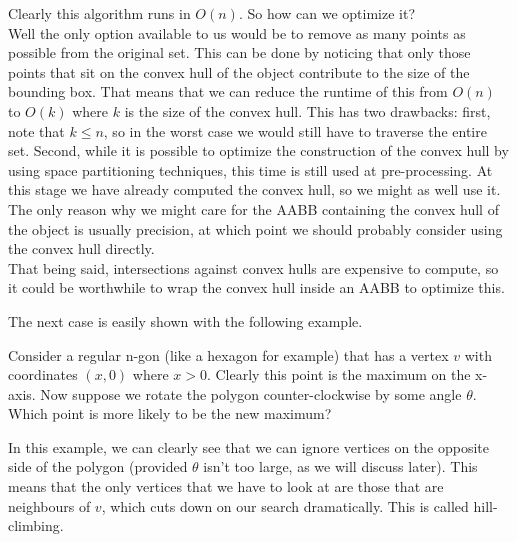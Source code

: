     Clearly this algorithm runs in $O(n)$. So how can we optimize it?\\
    Well the only option available to us would be to remove as many points as
    possible from the original set. This can be done by noticing that only those
    points that sit on the convex hull of the object contribute to the size of
    the bounding box. That means that we can reduce the runtime of this from
    $O(n)$ to $O(k)$ where $k$ is the size of the convex hull. This has two
    drawbacks: first, note that $k \leq n$, so in the worst case we would still
    have to traverse the entire set. Second, while it is possible to optimize
    the construction of the convex hull by using space partitioning techniques,
    this time is still used at pre-processing. At this stage we have already
    computed the convex hull, so we might as well use it. The only reason why we
    might care for the AABB containing the convex hull of the object is usually
    precision, at which point we should probably consider using the convex hull
    directly.\\
    That being said, intersections against convex hulls are expensive to
    compute, so it could be worthwhile to wrap the convex hull inside an AABB to
    optimize this.

    The next case is easily shown with the following example.
    \begin{exmp}
      Consider a regular n-gon (like a hexagon for example) that has a vertex
      $v$ with coordinates $(x, 0)$ where $x > 0$. Clearly this point is the
      maximum on the x-axis. Now suppose we rotate the polygon counter-clockwise
      by some angle $\theta$. Which point is more likely to be the new maximum?
    \end{exmp}

    In this example, we can clearly see that we can ignore vertices on the
    opposite side of the polygon (provided $\theta$ isn't too large, as we will
    discuss later). This means that the only vertices that we have to look at
    are those that are neighbours of $v$, which cuts down on our search
    dramatically. This is called hill-climbing.

